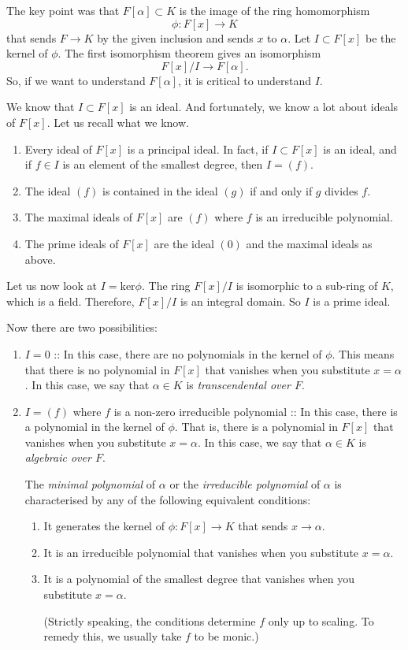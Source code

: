 \documentclass[11pt]{article}
\begin{document}
The key point was that \(F[\alpha] \subset K\) is the image of the ring homomorphism
\[ \phi \colon F[x] \to K \]
that sends \(F \to K\) by the given inclusion and sends \(x\) to \(\alpha\).
Let \(I \subset F[x]\) be the kernel of \(\phi\).
The first isomorphism theorem gives an isomorphism
\[ F[x]/I \to F[\alpha].\]
So, if we want to understand \(F[\alpha]\), it is critical to understand \(I\).

We know that \(I \subset F[x]\) is an ideal.
And fortunately, we know a lot about ideals of \(F[x]\).
Let us recall what we know.
\begin{enumerate}
\item Every ideal of \(F[x]\) is a principal ideal.
In fact, if \(I \subset F[x]\) is an ideal, and if \(f \in I\) is an element of the smallest degree, then \(I = (f)\).
\item The ideal \((f)\) is contained in the ideal \((g)\) if and only if \(g\) divides \(f\).
\item The maximal ideals of \(F[x]\) are \((f)\) where \(f\) is an irreducible polynomial.
\item The prime ideals of \(F[x]\) are the ideal \((0)\) and the maximal ideals as above.
\end{enumerate}

Let us now look at \(I = \mathrm{ker}\phi\).
The ring \(F[x]/I\) is isomorphic to a sub-ring of \(K\), which is a field.
Therefore, \(F[x]/I\) is an integral domain.
So \(I\) is a prime ideal.

Now there are two possibilities: 
\begin{enumerate}
\item \(I = 0\) :: In this case, there are no polynomials in the kernel of \(\phi\).
This means that there is no polynomial in \(F[x]\) that vanishes when you substitute \(x = \alpha\).
In this case, we say that \(\alpha \in K\) is \emph{transcendental over \(F\)}.
\item \(I = (f)\) where \(f\) is a non-zero irreducible polynomial :: In this case, there is a polynomial in the kernel of \(\phi\).
That is, there is a polynomial in \(F[x]\) that vanishes when you substitute \(x = \alpha.\)
In this case, we say that \(\alpha \in K\) is \emph{algebraic over \(F\)}.

The \emph{minimal polynomial} of \(\alpha\) or the \emph{irreducible polynomial} of \(\alpha\) is characterised by any of the following equivalent conditions:

\begin{enumerate}
\item It generates the kernel of \(\phi \colon F[x] \to K\) that sends \(x \to \alpha\).

\item It is an irreducible polynomial that vanishes when you substitute \(x = \alpha\).

\item It is a polynomial of the smallest degree that vanishes when you substitute \(x = \alpha\).

(Strictly speaking, the conditions determine \(f\) only up to scaling.  To remedy this, we usually take \(f\) to be monic.)
\end{enumerate}
\end{enumerate}
\end{document}
